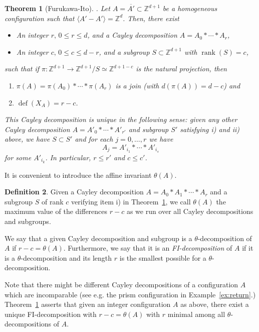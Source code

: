 \documentclass[11pt]{amsart}
\theoremstyle{plain}
\newtheorem{theorem}{Theorem}[section]
\theoremstyle{definition}
\newtheorem{definition}[theorem]{Definition}
\theoremstyle{remark}
\newcommand{\rank}{\operatorname{rank}}
\newcommand{\defect}{{\operatorname {def}}}
\newcommand{\baseRing}[1]{\ensuremath{\mathbb{#1}}}
\newcommand{\Z}{\baseRing{Z}}
\numberwithin{equation}{section}
\begin{document}
\begin{theorem}[Furukawa-Ito]\label{th:fi}.  Let $A = \overline{A'} \subset \Z^{d+1}$ be a homogeneous configuration such that $\langle A' - A' \rangle = \Z^d$.  Then, there exist
\begin{itemize}
\item An integer $r, \, 0 \le r \le d$,  and a Cayley decomposition $A = A_0 \ast \cdots \ast A_r$, 
\item An integer $c, \,  0 \le c\le d-r$, and a subgroup $S \subset \Z^{d+1}$ with $\rank(S) =c$,
\end{itemize}
such that if  $\pi \colon \Z^{d+1} \to \Z^{d+1}/S \simeq \Z^{d+1-c}$ is the natural projection, then
\begin{enumerate}
\item[i)] $\pi(A) = \pi(A_0) \ast \cdots \ast \pi(A_r)$ is a join (with $d(\pi(A)) = d-c$) and
\item[ii)] $\defect(X_A) = r - c$.
\end{enumerate}
This Cayley decomposition is unique in the following sense: given any other Cayley decomposition $A = A'_0 \ast \cdots \ast A'_{r'}$ and subgroup $S'$ satisfying i) and ii) above, we have $S \subset S'$ and for each $j=0,\dots,r$ we have
$$A_j = A'_{i_1} \ast \cdots \ast A'_{i_s}$$
for some $A'_{i_k}$. In particular, $r \le r'$ and $c \le c'$.
\end{theorem}
 
 It is convenient to introduce the affine invariant $\theta(A)$.

\begin{definition}\label{def:theta}
Given a Cayley decomposition $A = A_0\ast A_1 \ast \cdots \ast A_r$  and  a subgroup $S$ of rank $c$
 verifying  item i) in Theorem~\ref{th:fi},   we call $\theta(A)$ the maximum value of the differences $r- c$ as we run over all Cayley decompositions and subgroups.

We say that  a given Cayley decomposition and subgroup is a $\theta$-decomposition of $A$ if $r - c = \theta(A)$.  
Furthermore, we say that it is an {\em FI-decomposition} of $A$ if it is a $\theta$-decomposition and its length $r$ is the smallest possible for a $\theta$-decomposition.
\end{definition}

Note that there might be different Cayley decompositions of a configuration $A$ which are incomparable (see e.g. the prism configuration in Example~\ref{ex:return}.) Theorem~\ref{th:fi} asserts that  given an integer configuration $A$ as above, there exist a unique FI-decomposition with $r-c= \theta(A)$ with $r$ minimal among all $\theta$-decompositions of $A$.  
\end{document}
